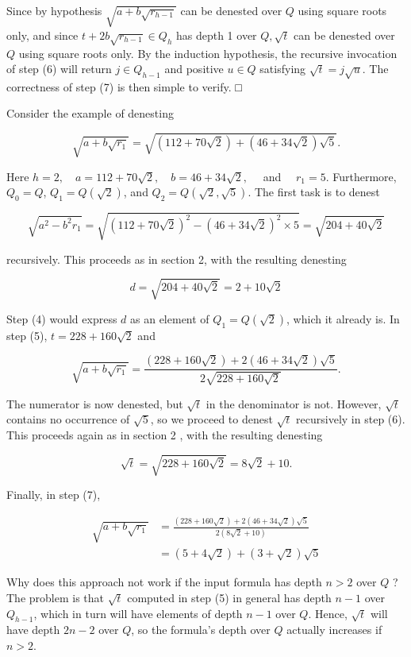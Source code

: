 \documentclass[11pt,letterpaper]{article}
\begin{document}
Since by hypothesis $\sqrt{a+b \sqrt{r_{h-1}}}$ can be denested over $Q$ using square roots only, and since $t+2 b \sqrt{r_{h-1}} \in Q_{h}$ has depth 1 over $Q, \sqrt{t}$ can be denested over $Q$ using square roots only. By the induction hypothesis, the recursive invocation of step (6) will return $j \in Q_{h-1}$ and positive $u \in Q$ satisfying $\sqrt{t}=j \sqrt{u}$. The correctness of step (7) is then simple to verify. □

Consider the example of denesting

\[
\sqrt{a+b \sqrt{r_{1}}}=\sqrt{(112+70 \sqrt{2})+(46+34 \sqrt{2}) \sqrt{5}} .
\]

Here $h=2, \quad a=112+70 \sqrt{2}, \quad b=46+34 \sqrt{2}, \quad$ and $\quad r_{1}=5$. Furthermore, $Q_{0}=Q$, $Q_{1}=Q(\sqrt{2})$, and $Q_{2}=Q(\sqrt{2}, \sqrt{5})$. The first task is to denest

\[
\sqrt{a^{2}-b^{2} r_{1}}=\sqrt{(112+70 \sqrt{2})^{2}-(46+34 \sqrt{2})^{2} \times 5}=\sqrt{204+40 \sqrt{2}}
\]

recursively. This proceeds as in section 2, with the resulting denesting

\[
d=\sqrt{204+40 \sqrt{2}}=2+10 \sqrt{2}
\]

Step (4) would express $d$ as an element of $Q_{1}=Q(\sqrt{2})$, which it already is. In step (5), $t=228+160 \sqrt{2}$ and

\[
\sqrt{a+b \sqrt{r_{1}}}=\frac{(228+160 \sqrt{2})+2(46+34 \sqrt{2}) \sqrt{5}}{2 \sqrt{228+160 \sqrt{2}}} .
\]

The numerator is now denested, but $\sqrt{t}$ in the denominator is not. However, $\sqrt{t}$ contains no occurrence of $\sqrt{5}$, so we proceed to denest $\sqrt{t}$ recursively in step (6). This proceeds again as in section 2 , with the resulting denesting

\[
\sqrt{t}=\sqrt{228+160 \sqrt{2}}=8 \sqrt{2}+10 .
\]

Finally, in step (7),

\[
\begin{aligned}
\sqrt{a+b \sqrt{r_{1}}} & =\frac{(228+160 \sqrt{2})+2(46+34 \sqrt{2}) \sqrt{5}}{2(8 \sqrt{2}+10)} \\
& =(5+4 \sqrt{2})+(3+\sqrt{2}) \sqrt{5}
\end{aligned}
\]

Why does this approach not work if the input formula has depth $n>2$ over $Q$ ? The problem is that $\sqrt{t}$ computed in step (5) in general has depth $n-1$ over $Q_{h-1}$, which in turn will have elements of depth $n-1$ over $Q$. Hence, $\sqrt{t}$ will have depth $2 n-2$ over $Q$, so the formula's depth over $Q$ actually increases if $n>2$.
\end{document}

